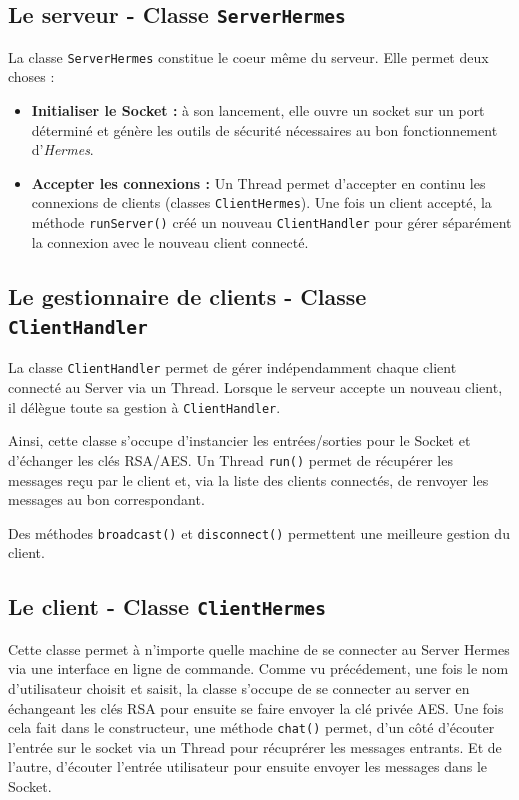 \documentclass{article}
\begin{document}
\subsection{Le serveur - Classe \texttt{ServerHermes}}

La classe \texttt{ServerHermes} constitue le coeur même du serveur. 
Elle permet deux choses :
\begin{itemize}
    \item \textbf{Initialiser le Socket : } à son lancement, elle ouvre un socket sur un port déterminé et génère les outils 
    de sécurité nécessaires au bon fonctionnement d'\emph{Hermes}. 
    \item \textbf{Accepter les connexions : } Un Thread permet d'accepter en continu les connexions de clients (classes \texttt{ClientHermes}). 
    Une fois un client accepté, la méthode \texttt{runServer()} créé un nouveau \texttt{ClientHandler} pour gérer séparément 
    la connexion avec le nouveau client connecté. 
\end{itemize}

\subsection{Le gestionnaire de clients - Classe \texttt{ClientHandler}}

La classe \texttt{ClientHandler} permet de gérer indépendamment chaque client connecté au Server via un Thread. 
Lorsque le serveur accepte un nouveau client, il délègue toute sa gestion à \texttt{ClientHandler}. 

Ainsi, cette classe s'occupe d'instancier les entrées/sorties pour le Socket et d'échanger les clés RSA/AES. 
Un Thread \texttt{run()} permet de récupérer les messages reçu par le client et, via la liste des clients connectés, 
de renvoyer les messages au bon correspondant. 

Des méthodes \texttt{broadcast()} et \texttt{disconnect()} permettent une meilleure gestion du client. 


\subsection{Le client - Classe \texttt{ClientHermes}}

Cette classe permet à n'importe quelle machine de se connecter au Server Hermes via une interface en ligne de commande. 
Comme vu précédement, une fois le nom d'utilisateur choisit et saisit, la classe s'occupe de se connecter au server en échangeant 
les clés RSA pour ensuite se faire envoyer la clé privée AES. 
Une fois cela fait dans le constructeur, une méthode \texttt{chat()} permet, d'un côté d'écouter l'entrée sur le socket via un Thread
pour récuprérer les messages entrants. Et de l'autre, d'écouter l'entrée utilisateur pour ensuite envoyer les messages dans le Socket. 
\end{document}

